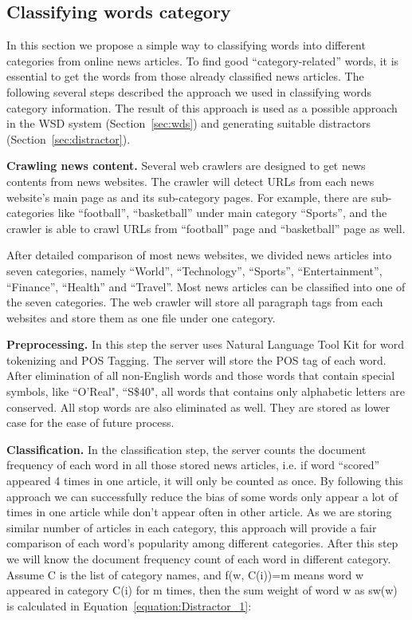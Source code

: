 \subsection{Classifying words category}
\label{subsec:category}
In this section we propose a simple way to classifying words into different categories from online news articles. To find good “category-related” words, it is essential to get the words from those already classified news articles. The following several steps described the approach we used in classifying words category information. The result of this approach is used as a possible approach in the WSD system (Section~\ref{sec:wds}) and generating suitable distractors (Section~\ref{sec:distractor}). 

{\bf Crawling news content.}
Several web crawlers are designed to get news contents from news websites. The crawler will detect URLs from each news website’s main page as and its sub-category pages. For example, there are sub-categories like “football”, “basketball” under main category “Sports”, and the crawler is able to crawl URLs from “football” page and “basketball” page as well. 

After detailed comparison of most news websites, we divided news articles into seven categories, namely “World”, “Technology”, “Sports”, “Entertainment”, “Finance”, “Health” and “Travel”. Most news articles can be classified into one of the seven categories. The web crawler will store all paragraph tags from each websites and store them as one file under one category. 

{\bf Preprocessing.}
In this step the server uses Natural Language Tool Kit \cite{edw09} for word tokenizing and POS Tagging. The server will store the POS tag of each word. After elimination of all non-English words and those words that contain special symbols, like ``O’Real", ``S\$40", all words that contains only alphabetic letters are conserved. All stop words are also eliminated as well. They are stored as lower case for the ease of future process.

{\bf Classification.}
In the classification step, the server counts the document frequency of each word in all those stored news articles, i.e. if word “scored” appeared 4 times in one article, it will only be counted as once. By following this approach we can successfully reduce the bias of some words only appear a lot of times in one article while don’t appear often in other article. As we are storing similar number of articles in each category, this approach will provide a fair comparison of each word’s popularity among different categories. After this step we will know the document frequency count of each word in different category. 
Assume C is the list of category names, and f(w, C(i))=m means word w appeared in category C(i) for m times, then the sum weight of word w as sw(w) is calculated in Equation~\ref{equation:Distractor_1}:

